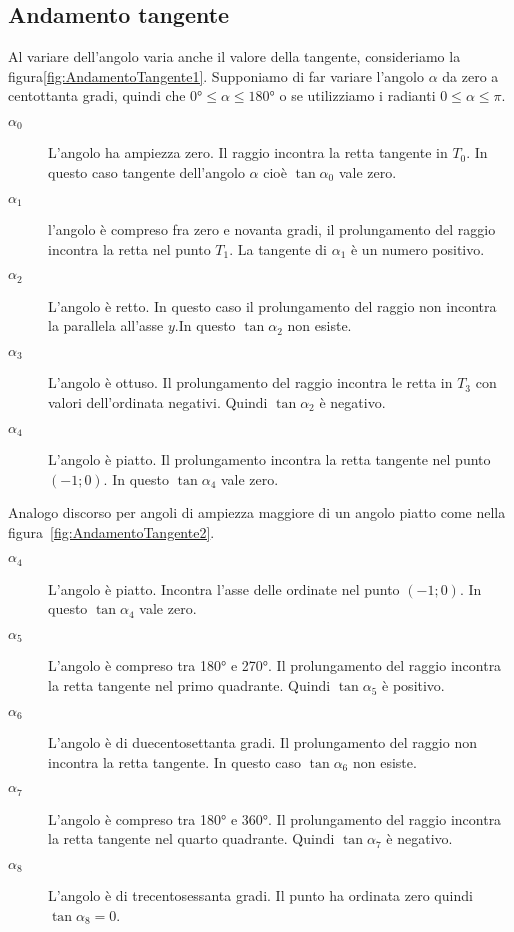 \subsection{Andamento tangente}
\label{sec:AndamentoTangente}
Al variare dell'angolo varia anche il valore della tangente, consideriamo la figura\nobs\vref{fig:AndamentoTangente1}. Supponiamo di far variare l'angolo $\alpha$ da zero a centottanta gradi, quindi che $\ang{0}\leq\alpha\leq\ang{180}$ o se utilizziamo i radianti $0\leq\alpha\leq\pi$. 
\begin{description}
	\item[$\alpha_0$] L'angolo ha ampiezza zero. Il raggio incontra la retta tangente in  $T_0$. In questo caso  tangente  dell'angolo $\alpha$ cioè $\tan\alpha_0$ vale zero.
	\item [$\alpha_1$] l'angolo è compreso fra zero e novanta gradi, il prolungamento del raggio  incontra la retta nel punto $T_1$. La tangente di $\alpha_1$ è un numero positivo.
	\item [$\alpha_2$] L'angolo  è retto. In questo caso il prolungamento del raggio non incontra la parallela all'asse $y$.In questo    $\tan\alpha_2$ non esiste. 
	\item [$\alpha_3$]  L'angolo è ottuso. Il prolungamento del raggio incontra le retta in $T_3$  con valori dell'ordinata negativi. Quindi $\tan\alpha_2$ è negativo.
	\item [$\alpha_4$] L'angolo  è  piatto. Il  prolungamento incontra la retta tangente  nel punto $(-1;0)$. In questo  $\tan\alpha_4$ vale zero.
\end{description}
Analogo discorso per angoli di ampiezza  maggiore di un angolo  piatto come nella figura~\vref{fig:AndamentoTangente2}.
\begin{description}
	\item [$\alpha_4$] L'angolo è piatto. Incontra l'asse delle ordinate nel punto $(-1;0)$. In questo  $\tan\alpha_4$ vale zero.
	\item [$\alpha_5$] L'angolo è compreso tra \ang{180} e \ang{270}. Il prolungamento del raggio incontra la retta tangente  nel primo quadrante. Quindi $\tan\alpha_5$ è positivo.
	\item [$\alpha_6$] L'angolo è di duecentosettanta gradi. Il prolungamento del raggio non incontra la retta  tangente. In questo caso  $\tan\alpha_6$ non esiste. 
	\item [$\alpha_7$] L'angolo è compreso tra \ang{180} e \ang{360}. Il prolungamento del raggio incontra la retta tangente nel quarto quadrante. Quindi $\tan\alpha_7$ è negativo.
	\item [$\alpha_8$] L'angolo è di trecentosessanta gradi. Il punto ha ordinata zero quindi  $\tan\alpha_8=0$.
\end{description}
